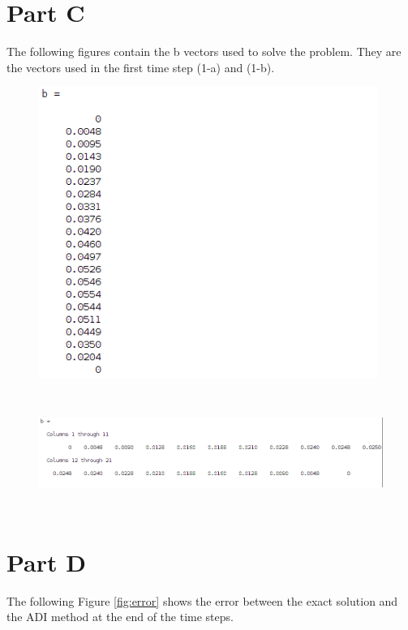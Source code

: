 \documentclass[12pt]{article}
\begin{document}
		\section{Part C}
		
		\noindent The following figures contain the b vectors used to solve the problem. They are the vectors used in the first time step (1-a) and (1-b).
		
		\begin{figure}[H]
			\centering
			\includegraphics[height=3.75in]{b_mat_1.png}
			\label{fig:bmat1}
		\end{figure}
		
		\begin{figure}[H]
			\centering
			\includegraphics[height=1.5in]{b_mat_2.png}
			\label{fig:bmat2}
		\end{figure}
		
			
	\section{Part D}
	
	\noindent The following Figure \ref{fig:error} shows the error between the exact solution and the ADI method at the end of the time steps.
	
\end{document}
